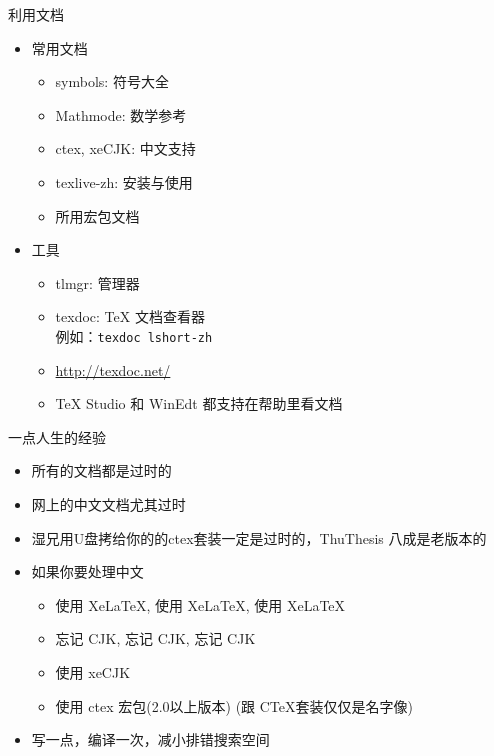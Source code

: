 \begin{frame}{利用文档}
	\begin{itemize}
		\item 常用文档
			\begin{itemize}
				\item symbols: 符号大全
				\item Mathmode: 数学参考
				\item ctex, xeCJK: 中文支持
				\item texlive-zh: \TL 安装与使用
				\item 所用宏包文档
			\end{itemize}
		\item 工具
			\begin{itemize}
				\item tlmgr: \TL 管理器
				\item texdoc: \TeX{} 文档查看器\\
					例如：\texttt{texdoc lshort-zh}
        \item \url{http://texdoc.net/}
        \item TeX Studio 和 WinEdt 都支持在帮助里看文档
			\end{itemize}
	\end{itemize}
\end{frame}

\begin{frame}{一点人生的经验}
  \begin{itemize}
    \item 所有的文档都是过时的
    \item 网上的中文文档尤其过时
    \item 湿兄用U盘拷给你的的ctex套装一定是过时的，ThuThesis 八成是老版本的
    \item 如果你要处理中文
      \begin{itemize}
        \item 使用 XeLaTeX, 使用 XeLaTeX, 使用 XeLaTeX
        \item 忘记 CJK, 忘记 CJK, 忘记 CJK
        \item 使用 xeCJK
        \item 使用 ctex 宏包(2.0以上版本) (跟 C\TeX 套装仅仅是名字像)
      \end{itemize}
    \item 写一点，编译一次，减小排错搜索空间
  \end{itemize} 
\end{frame}

